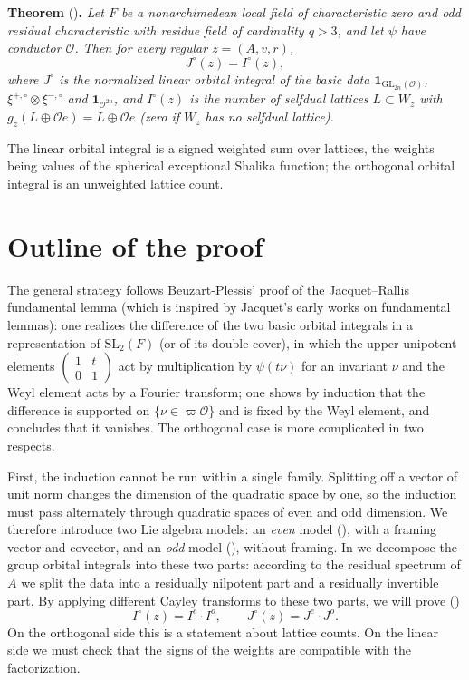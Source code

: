 \documentclass[11pt,oneside,notitlepage]{book}
\numberwithin{equation}{section}
\theoremstyle{plain}
\theoremstyle{definition}
\newcommand{\cO}{\mathcal{O}}
\newcommand{\GL}{\mathrm{GL}}
\newcommand{\SL}{\mathrm{SL}}
\newcommand{\one}{\mathbf{1}}
\begin{document}
\medskip\noindent\textbf{Theorem} ()\textbf{.} \emph{Let $F$ be a nonarchimedean local field of characteristic zero and odd residual characteristic with residue field of cardinality $q>3$, and let $\psi$ have conductor $\cO$. Then for every regular $z=(A,v,r)$,
	\[J^\circ(z)=I^\circ(z),\]
	where $J^\circ$ is the normalized linear orbital integral of the basic data $\one_{\GL_{2n}(\cO)}$, $\xi^{+,\circ}\otimes\xi^{-,\circ}$ and $\one_{\cO^{2n}}$, and $I^\circ(z)$ is the number of selfdual lattices $L\subset W_z$ with $g_z(L\oplus\cO e)=L\oplus\cO e$ (zero if $W_z$ has no selfdual lattice).}\medskip

The linear orbital integral is a signed weighted sum over lattices, the weights being values of the spherical exceptional Shalika function; the orthogonal orbital integral is an unweighted lattice count. %

\section{Outline of the proof}

The general strategy follows Beuzart-Plessis' proof of the Jacquet--Rallis fundamental lemma \cite{BP} (which is inspired by Jacquet's early works on fundamental lemmas): one realizes the difference of the two basic orbital integrals in a representation of $\SL_2(F)$ (or of its double cover), in which the upper unipotent elements $\begin{pmatrix} 1 & t\\ 0& 1\end{pmatrix}$ act by multiplication by $\psi(t\nu)$ for an invariant $\nu$ and the Weyl element acts by a Fourier transform; one shows by induction that the difference is supported on $\{\nu\in\varpi\cO\}$ and is fixed by the Weyl element, and concludes that it vanishes. The orthogonal case is more complicated in two respects.

First, the induction cannot be run within a single family. Splitting off a vector of unit norm changes the dimension of the quadratic space by one, so the induction must pass alternately through quadratic spaces of even and odd dimension. We therefore introduce two Lie algebra models: an \emph{even} model (), with a framing vector and covector, and an \emph{odd} model (), without framing. In  we decompose the group orbital integrals into these two parts: according to the residual spectrum of $A$ we split the data into a residually nilpotent part and a residually invertible part. By applying different Cayley transforms to these two parts, we will prove ()
\[I^\circ(z)=I^e\cdot I^o,\qquad J^\circ(z)=J^e\cdot J^o .\]
On the orthogonal side this is a statement about lattice counts. On the linear side we must check that the signs of the weights are compatible with the factorization.
\end{document}
